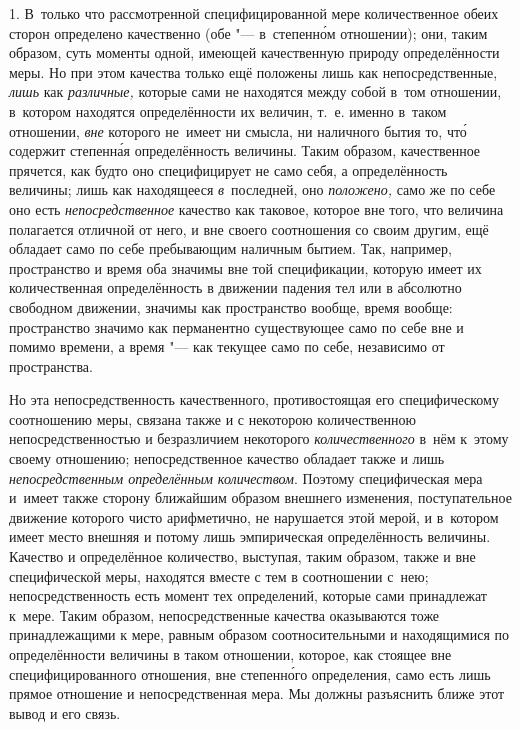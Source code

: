 
1. В~только что рассмотренной специфицированной мере количественное обеих
сторон определено качественно (обе "--- в~степенн\'{о}м отношении); они, таким
образом, суть моменты одной, имеющей качественную природу определённости меры.
Но при этом качества только ещё положены лишь как непосредственные, {\em лишь}
как {\em различные,} которые сами не находятся между собой в~том отношении,
в~котором находятся определённости их величин, т.~е. именно в~таком отношении,
{\em вне} которого не~имеет ни смысла, ни наличного бытия то, чт\'{о} содержит
степенн\'{а}я определённость величины. Таким образом, качественное прячется,
как будто оно специфицирует не само себя, а определённость величины; лишь как
находящееся {\em в}~последней, оно {\em положено,} само же по себе оно есть
{\em непосредственное} качество как таковое, которое вне того, что величина
полагается отличной от него, и вне своего соотношения со своим другим, ещё
обладает само по себе пребывающим наличным бытием. Так, например, пространство
и время оба значимы вне той спецификации, которую имеет их количественная
определённость в движении падения тел или в абсолютно свободном движении,
значимы как пространство вообще, время вообще: пространство значимо как
перманентно существующее само по себе вне и помимо времени, а время "--- как
текущее само по себе, независимо от пространства.

Но эта непосредственность качественного, противостоящая его специфическому
соотношению меры, связана также и с некоторою количественною
непосредственностью и безразличием некоторого {\em количественного} в~нём
к~этому своему отношению; непосредственное качество обладает также и лишь
{\em непосредственным определённым количеством}. Поэтому специфическая мера
и~имеет также сторону ближайшим образом внешнего изменения, поступательное
движение которого чисто арифметично, не нарушается этой мерой, и в~котором
имеет место внешняя и потому лишь эмпирическая определённость величины.
Качество и определённое количество, выступая, таким образом, также и вне
специфической меры, находятся вместе с тем в соотношении с~нею;
непосредственность есть момент тех определений, которые сами принадлежат
к~мере. Таким образом, непосредственные качества оказываются тоже
принадлежащими к мере, равным образом соотносительными и находящимися по
определённости величины в таком отношении, которое, как стоящее вне
специфицированного отношения, вне степенн\'{о}го определения, само есть лишь
прямое отношение и непосредственная мера. Мы должны разъяснить ближе этот
вывод и его связь.

